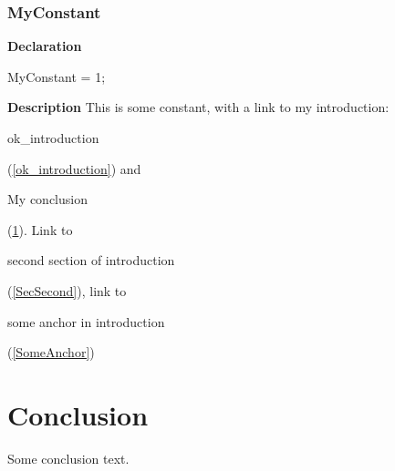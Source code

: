 \documentclass{report}
\newif\ifpdf
\begin{document}
\subsection*{MyConstant}
\fi
\label{ok_introduction_conclusion-MyConstant}
\begin{list}{}{
\setlength{\itemindent}{0cm}
\setlength{\listparindent}{0cm}
\setlength{\leftmargin}{\evensidemargin}
\addtolength{\leftmargin}{\tmplength}
\settowidth{\labelsep}{X}
\addtolength{\leftmargin}{\labelsep}
\setlength{\labelwidth}{\tmplength}
}
\item[\textbf{Declaration}\hfill]
\ifpdf
\begin{flushleft}
\fi
\begin{ttfamily}
MyConstant = 1;\end{ttfamily}

\ifpdf
\end{flushleft}
\fi

\par
\item[\textbf{Description}]
This is some constant, with a link to my introduction: \begin{ttfamily}ok{\_}introduction\end{ttfamily}(\ref{ok_introduction}) and \begin{ttfamily}My conclusion\end{ttfamily}(\ref{ok_conclusion}). Link to \begin{ttfamily}second section of introduction\end{ttfamily}(\ref{SecSecond}), link to \begin{ttfamily}some anchor in introduction\end{ttfamily}(\ref{SomeAnchor})

\end{list}
\chapter{Conclusion}
\label{ok_conclusion}
Some conclusion text.
\end{document}

